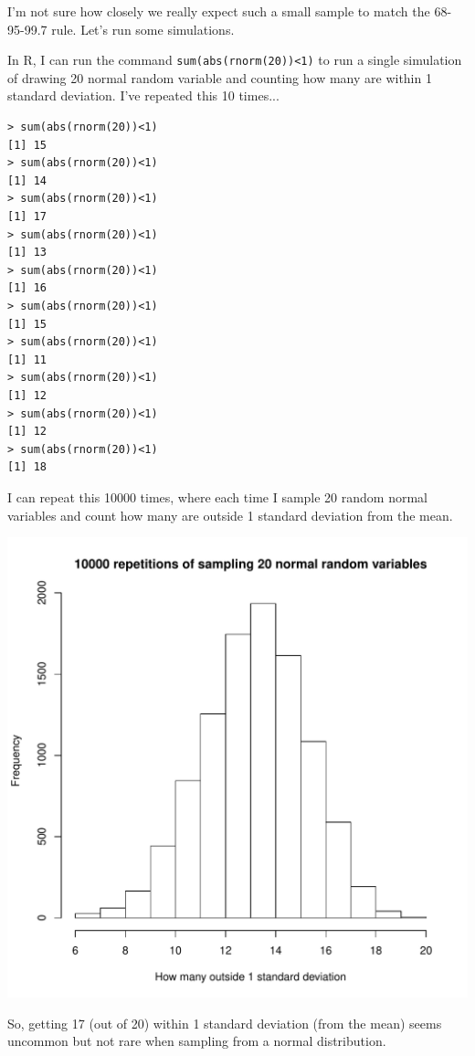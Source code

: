 \documentclass[12pt,letterpaper]{article}
\begin{document}
\begin{enumerate}
\begin{enumerate}
I'm not sure how closely we really expect such a small sample to match the 68-95-99.7 rule. Let's run some simulations.

In R, I can run the command \texttt{sum(abs(rnorm(20))<1)} to run a single simulation of drawing 20 normal random variable and counting how many are within 1 standard deviation. I've repeated this 10 times...

\begin{verbatim}
> sum(abs(rnorm(20))<1)
[1] 15
> sum(abs(rnorm(20))<1)
[1] 14
> sum(abs(rnorm(20))<1)
[1] 17
> sum(abs(rnorm(20))<1)
[1] 13
> sum(abs(rnorm(20))<1)
[1] 16
> sum(abs(rnorm(20))<1)
[1] 15
> sum(abs(rnorm(20))<1)
[1] 11
> sum(abs(rnorm(20))<1)
[1] 12
> sum(abs(rnorm(20))<1)
[1] 12
> sum(abs(rnorm(20))<1)
[1] 18
\end{verbatim}

I can repeat this 10000 times, where each time I sample 20 random normal variables and count how many are outside 1 standard deviation from the mean.
\begin{center}
\includegraphics[scale=0.6]{figures/variability_of_68_rule/variability_of_68_rule.pdf}
\end{center}
So, getting 17 (out of 20) within 1 standard deviation (from the mean) seems uncommon but not rare when sampling from a normal distribution.


\end{enumerate}
\end{enumerate}
\end{document}
